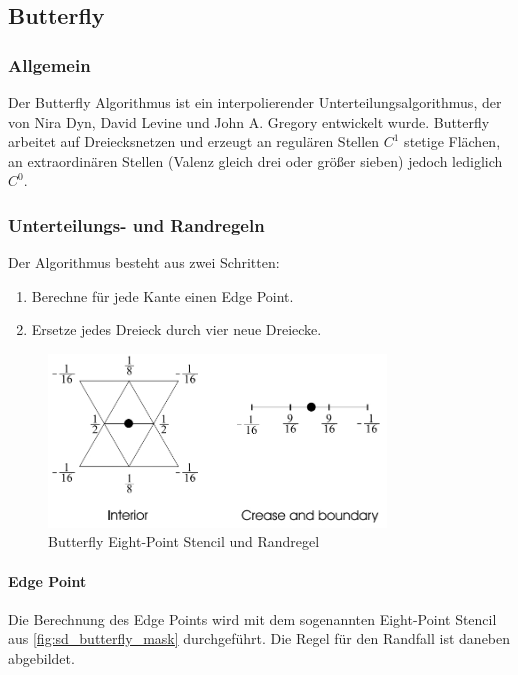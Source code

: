 \subsection{Butterfly} \label{subsec:butterfly}

\subsubsection*{Allgemein}

Der Butterfly Algorithmus ist ein interpolierender Unterteilungsalgorithmus,
der von Nira Dyn, David Levine und John A. Gregory entwickelt wurde.
Butterfly arbeitet auf Dreiecksnetzen und erzeugt an regulären Stellen
\(C^1\) stetige Flächen, an extraordinären Stellen
(Valenz gleich drei oder größer sieben) jedoch lediglich \(C^0\).
\cite[S. 64ff]{Standford.24.07.2015} \cite[S. 72ff]{Zorin.subdivcourse}
\cite{Seeger01asub-atomic}
\cite{Gamasutra}
\cite{Sharp}
\cite{Zorin:1996:ISM:237170.237254}

\subsubsection*{Unterteilungs- und Randregeln}

Der Algorithmus besteht aus zwei Schritten:
\begin{enumerate}
\item Berechne für jede Kante einen Edge Point.
\item Ersetze jedes Dreieck durch vier neue Dreiecke.
\end{enumerate}

\begin{figure}
\centering
\includegraphics[width=0.8\textwidth]{content/media/sd_butterfly_mask.jpg}
\caption{Butterfly Eight-Point Stencil und Randregel \cite{Seeger01asub-atomic}}
\label{fig:sd_butterfly_mask}
\end{figure}

\paragraph*{Edge Point}
Die Berechnung des Edge Points wird mit dem sogenannten Eight-Point Stencil
aus \autoref{fig:sd_butterfly_mask} durchgeführt.
Die Regel für den Randfall ist daneben abgebildet.


